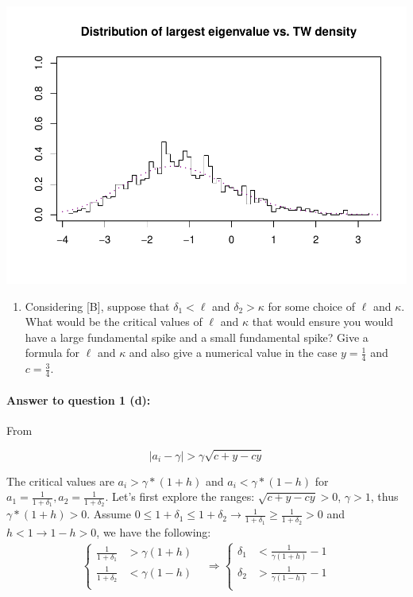 \documentclass[
]{article}
\providecommand{\tightlist}{%
  \setlength{\itemsep}{0pt}\setlength{\parskip}{0pt}}
\begin{document}
\includegraphics{A5_files/figure-latex/unnamed-chunk-4-2.pdf}

\begin{enumerate}
\def\labelenumi{(\alph{enumi})}
\setcounter{enumi}{3}
\tightlist
\item
  Considering {[}B{]}, suppose that \(\delta_1 < \ell\) and
  \(\delta_2 > \kappa\) for some choice of \(\ell\) and \(\kappa\). What
  would be the critical values of \(\ell\) and \(\kappa\) that would
  ensure you would have a large fundamental spike and a small
  fundamental spike? Give a formula for \(\ell\) and \(\kappa\) and also
  give a numerical value in the case \(y = \frac{1}{4}\) and
  \(c = \frac{3}{4}\).
\end{enumerate}

\paragraph{\texorpdfstring{\textbf{Answer to question 1
(d)}:}{Answer to question 1 (d):}}\label{answer-to-question-1-d}

From

\[
|a_i - \gamma| > \gamma\sqrt{c + y - cy}
\]

The critical values are \(a_i > \gamma * (1 + h)\) and
\(a_i < \gamma * (1 - h)\) for
\(a_1 = \frac{1}{1 + \delta_1}, a_2 = \frac{1}{1+ \delta_2}\). Let's
first explore the ranges: \(\sqrt{c + y -cy} >0\), \(\gamma>1\), thus
\(\gamma*(1+h) > 0\). Assume
\(0 \leq 1+\delta_1 \leq 1+\delta_2 \rightarrow \frac{1}{1+\delta_1}\geq\frac{1}{1+\delta_2}>0\)
and \(h <1 \rightarrow 1-h>0\), we have the following: \begin{align*}
\left\{
\begin{array}{ll}
\frac{1}{1+\delta_1} & > \gamma(1+h) \\
\frac{1}{1+\delta_2} & < \gamma(1-h) \\
\end{array}
\right.
&\Rightarrow
\left\{
\begin{array}{ll}
\delta_1 & < \frac{1}{\gamma(1+h)} - 1 \\
\delta_2 & > \frac{1}{\gamma(1-h)} -1 \\
\end{array}
\right.
\end{align*}
\end{document}
